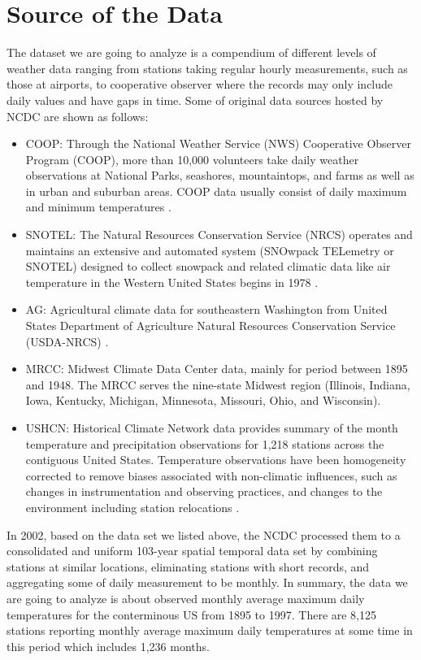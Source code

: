 \section{Source of the Data}

The dataset we are going to analyze is a compendium of different levels of 
weather data ranging from stations taking regular hourly measurements, such as 
those at airports, to cooperative observer where the records may only include 
daily values and have gaps in time. Some of original data sources hosted by NCDC 
\cite{NCEI} are shown as follows:

\begin{itemize}
  \item COOP:
    Through the National Weather Service (NWS) Cooperative Observer Program 
    (COOP), more than 10,000 volunteers take daily weather observations at 
    National Parks, seashores, mountaintops, and farms as well as in urban and 
    suburban areas. COOP data usually consist of daily maximum and minimum 
    temperatures \cite{COOP}.
  \item SNOTEL:
    The Natural Resources Conservation Service (NRCS) operates and maintains an 
    extensive and automated system (SNOwpack TELemetry or SNOTEL) designed to
    collect snowpack and related climatic data like air temperature in the Western
    United States begins in 1978 \cite{SNOTEL}.
  \item AG:
    Agricultural climate data for southeastern Washington from United States
    Department of Agriculture Natural Resources Conservation Service (USDA-NRCS) 
    \cite{USDA}.
  \item MRCC:
    Midwest Climate Data Center data, mainly for period between 1895 and 1948. 
    The MRCC \cite{MRCC} serves the nine-state Midwest region (Illinois, Indiana, 
    Iowa, Kentucky, Michigan, Minnesota, Missouri, Ohio, and Wisconsin).
  \item USHCN:
    Historical Climate Network data provides summary of the month temperature and 
    precipitation observations for 1,218 stations across the contiguous United 
    States. Temperature observations have been homogeneity corrected to remove 
    biases associated with non-climatic influences, such as changes in 
    instrumentation and observing practices, and changes to the environment 
    including station relocations \cite{USHCN}.
\end{itemize}

In 2002, based on the data set we listed above, the NCDC processed them to a
consolidated and uniform 103-year spatial temporal data set by combining stations 
at similar locations, eliminating stations with short records, and aggregating 
some of daily measurement to be monthly. In summary, the data we are going to 
analyze is about observed monthly average maximum daily temperatures 
for the conterminous US from 1895 to 1997. There are 8,125 stations reporting 
monthly average maximum daily temperatures at some time in this period which 
includes 1,236 months. 